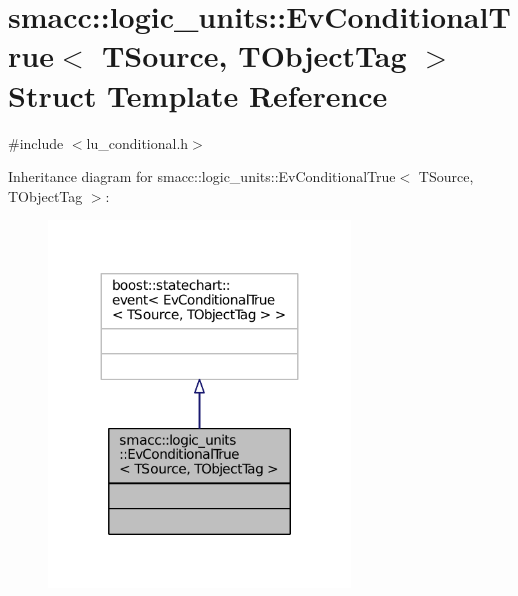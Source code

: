 \hypertarget{structsmacc_1_1logic__units_1_1EvConditionalTrue}{}\section{smacc\+:\+:logic\+\_\+units\+:\+:Ev\+Conditional\+True$<$ T\+Source, T\+Object\+Tag $>$ Struct Template Reference}
\label{structsmacc_1_1logic__units_1_1EvConditionalTrue}


{\ttfamily \#include $<$lu\+\_\+conditional.\+h$>$}



Inheritance diagram for smacc\+:\+:logic\+\_\+units\+:\+:Ev\+Conditional\+True$<$ T\+Source, T\+Object\+Tag $>$\+:
\nopagebreak
\begin{figure}[H]
\begin{center}
\leavevmode
\includegraphics[width=227pt]{structsmacc_1_1logic__units_1_1EvConditionalTrue__inherit__graph}
\end{center}
\end{figure}


